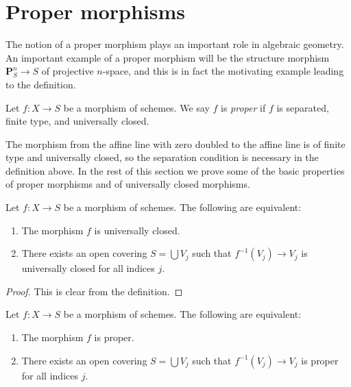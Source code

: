 \section{Proper morphisms}
\label{section-proper}

\noindent
The notion of a proper morphism plays an important role in algebraic
geometry. An important example of a proper morphism will be the
structure morphism $\mathbf{P}^n_S \to S$ of projective $n$-space,
and this is in fact the motivating example leading to the definition.

\begin{definition}
\label{definition-proper}
Let $f : X \to S$ be a morphism of schemes.
We say $f$ is {\it proper} if $f$ is separated, finite type, and
universally closed.
\end{definition}

\noindent
The morphism from the affine line with zero doubled to the affine line
is of finite type and universally closed, so the separation condition is
necessary in the definition above.
In the rest of this section we prove some of the basic properties
of proper morphisms and of universally closed morphisms.

\begin{lemma}
\label{lemma-universally-closed-local-on-the-base}
Let $f : X \to S$ be a morphism of schemes.
The following are equivalent:
\begin{enumerate}
\item The morphism $f$ is universally closed.
\item There exists an open covering $S = \bigcup V_j$ such
that $f^{-1}(V_j) \to V_j$ is universally closed for all indices $j$.
\end{enumerate}
\end{lemma}

\begin{proof}
This is clear from the definition.
\end{proof}

\begin{lemma}
\label{lemma-proper-local-on-the-base}
Let $f : X \to S$ be a morphism of schemes.
The following are equivalent:
\begin{enumerate}
\item The morphism $f$ is proper.
\item There exists an open covering $S = \bigcup V_j$ such
that $f^{-1}(V_j) \to V_j$ is proper for all indices $j$.
\end{enumerate}
\end{lemma}

